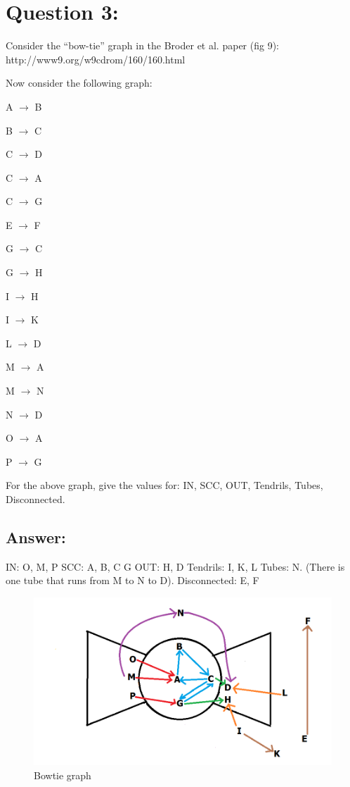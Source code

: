 \documentclass[a4paper, 11pt]{article}
\begin{document}
\fi


\section*{Question 3:}
Consider the ``bow-tie'' graph in the Broder et al. paper (fig 9):
    http://www9.org/w9cdrom/160/160.html

    Now consider the following graph:

    A $\longrightarrow$ B
    
    B $\longrightarrow$ C
    
    C $\longrightarrow$ D
    
    C $\longrightarrow$ A
    
    C $\longrightarrow$ G
    
    E $\longrightarrow$ F
    
    G $\longrightarrow$ C
    
    G $\longrightarrow$ H
    
    I $\longrightarrow$ H
    
    I $\longrightarrow$ K
    
    L $\longrightarrow$ D
    
    M $\longrightarrow$ A
    
    M $\longrightarrow$ N
    
    N $\longrightarrow$ D
    
    O $\longrightarrow$ A
    
    P $\longrightarrow$ G 
    
    For the above graph, give the values for: IN, SCC, OUT, Tendrils, Tubes, Disconnected.

\subsection*{Answer:}
IN: O, M, P
\noindent
\newline
SCC: A, B, C G
\noindent
\newline
OUT: H, D
\noindent
\newline
Tendrils: I, K, L
\noindent
\newline
Tubes: N. (There is one tube that runs from M to N to D).
\noindent
\newline
Disconnected: E, F
\begin{figure}[h]
\caption{Bowtie graph}
\centering
\includegraphics[scale=0.5]{bowtie.png}
\end{figure}
\end{document}
